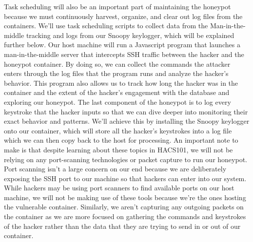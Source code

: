 \documentclass[12pt]{article}
\begin{document}
\indent Task scheduling will also be an important part of maintaining the honeypot because we must continuously harvest, organize, and clear out log files from the containers. We’ll use task scheduling scripts to collect data from the Man-in-the-middle tracking and logs from our Snoopy keylogger, which will be explained further below. \newline
\indent Our host machine will run a Javascript program that launches a man-in-the-middle server that intercepts SSH traffic between the hacker and the honeypot container. By doing so, we can collect the commands the attacker enters through the log files that the program runs and analyze the hacker’s behavior. This program also allows us to track how long the hacker was in the container and the extent of the hacker’s engagement with the database and exploring our honeypot. \newline
\indent The last component of the honeypot is to log every keystroke that the hacker inputs so that we can dive deeper into monitoring their exact behavior and patterns. We’ll achieve this by installing the Snoopy keylogger onto our container, which will store all the hacker’s keystrokes into a log file which we can then copy back to the host for processing. \newline
\indent An important note to make is that despite learning about these topics in HACS101, we will not be relying on any port-scanning technologies or packet capture to run our honeypot. Port scanning isn't a large concern on our end because we are deliberately exposing the SSH port to our machine so that hackers can enter into our system. While hackers may be using port scanners to find available ports on our host machine, we will not be making use of these tools because we're the ones hosting the vulnerable container. Similarly, we aren't capturing any outgoing packets on the container as we are more focused on gathering the commands and keystrokes of the hacker rather than the data that they are trying to send in or out of our container. 
\end{document}
